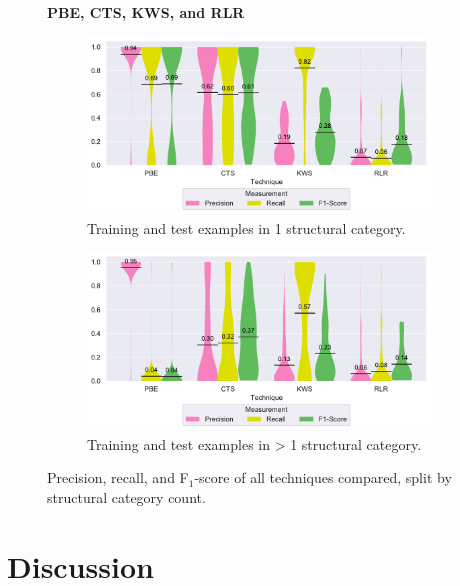 \begin{figure}
\centering
    \textbf{PBE, CTS, KWS, and RLR}\par\medskip
\begin{subfigure}[b]{\columnwidth}
		\centering
				\includegraphics[width=\columnwidth,
				clip]{img/big-study/recall-precision-singlecategory-all.pdf}
		\caption{Training and test examples in 1
		structural category.}
		\label{fig:recall-precision-singlecategory-all}
\end{subfigure}\hspace{\fill}
\begin{subfigure}[b]{\columnwidth}
		\centering
				\centering
		\includegraphics[width=\columnwidth,
		clip]{img/big-study/recall-precision-multicategory-all.pdf}
		\caption{Training and test examples in \textgreater
		1 structural
		category.}
		\label{fig:recall-precision-multicategory-all}
\end{subfigure}
\caption{Precision, recall, and F$_{1}$-score of all
techniques compared, split by structural category count.}
\label{fig:category-all}
\end{figure}

\section{Discussion}
\label{sec:discussion}

